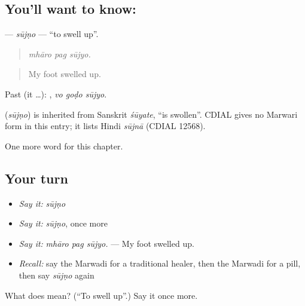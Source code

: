 \subsection*{You'll want to know: }
\textbf{} — \emph{sūjṇo} — \textquotedblleft{}to swell up\textquotedblright{}.

\begin{quote}
  
\end{quote}

\begin{quote}
\emph{mhāro pag sūjyo.}
\end{quote}

\begin{quote}
My foot swelled up.
\end{quote}

Past (it …):   , \emph{vo goḍo sūjyo}.

\begin{cousinweb}
\textbf{} (\emph{sūjṇo}) is inherited from Sanskrit \emph{śūyate}, \textquotedblleft{}is swollen\textquotedblright{}. CDIAL gives no Marwari form in this entry; it lists Hindi \emph{sūjnā} (CDIAL 12568).
\end{cousinweb}

\begin{grammarlens}[title={What you've built}]
One more word for this chapter.
\end{grammarlens}

\subsection*{Your turn}
\begin{itemize}
\raggedright
  \item \emph{Say it:} \emph{sūjṇo}
  \item \emph{Say it:} \emph{sūjṇo}, once more
  \item \emph{Say it:} \emph{mhāro pag sūjyo.} — My foot swelled up.
  \item \emph{Recall:} say the Marwadi for a traditional healer, then the Marwadi for a pill, then say \emph{sūjṇo} again
\end{itemize}

\begin{tcolorbox}[breakable,colback=teal!4,colframe=teal!35!black,title={Before you move on}]
What does  mean? (\textquotedblleft{}To swell up\textquotedblright{}.) Say it once more.
\end{tcolorbox}
